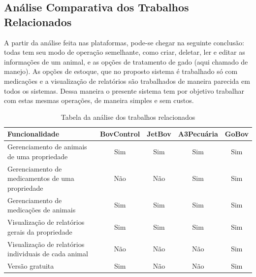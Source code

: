 \documentclass[12pt]{article}
\begin{document}




\subsection{Análise Comparativa dos Trabalhos Relacionados}

A partir da análise feita nas plataformas, pode-se chegar na seguinte conclusão: todas tem seu modo de operação semelhante, como criar, deletar, ler e editar as informações de um animal, e as opções de tratamento de gado (aqui chamado de manejo). As opções de estoque, que no proposto sistema é trabalhado só com medicações e a visualização de relatórios são trabalhados de maneira parecida em todos os sistemas. Dessa maneira o presente sistema tem por objetivo trabalhar com estas mesmas operações, de maneira simples e sem custos.
\begin{table}[th]
	\begin{center}
		\caption{Tabela da análise dos trabalhos relacionados}
		\begin{tabular}{ | p{8cm} |  c | c | c | c |}
			\hline
			Funcionalidade & BovControl & JetBov & A3Pecuária & GoBov \\ \hline
			Gerenciamento de animais de uma propriedade & Sim & Sim & Sim & Sim \\  \hline
			Gerenciamento de medicamentos de uma propriedade & Não & Não & Sim & Sim  \\ \hline
			Gerenciamento de medicações de animais & Sim & Sim & Sim & Sim  \\ \hline
			Visualização de relatórios gerais da propriedade & Sim & Sim & Sim & Sim  \\ \hline
			Visualização de relatórios individuais de cada animal & Não & Não & Não & Sim  \\ \hline
			Versão gratuita & Sim & Não & Não & Sim  \\
			\hline
		\end{tabular}
	\end{center}
\end{table}
\end{document}
